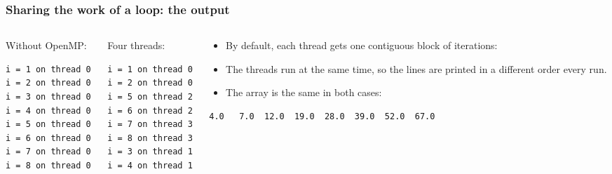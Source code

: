 \begin{frame}[fragile]
  \frametitle{Sharing the work of a loop: the output}
  \begin{columns}[T]
    \begin{column}{0.25\textwidth}
      Without OpenMP:
      \begin{lstlisting}[language=bash]
i = 1 on thread 0
i = 2 on thread 0
i = 3 on thread 0
i = 4 on thread 0
i = 5 on thread 0
i = 6 on thread 0
i = 7 on thread 0
i = 8 on thread 0
      \end{lstlisting}
    \end{column}

    \begin{column}{0.25\textwidth}
      Four threads:
      \begin{lstlisting}[language=bash]
i = 1 on thread 0
i = 2 on thread 0
i = 5 on thread 2
i = 6 on thread 2
i = 7 on thread 3
i = 8 on thread 3
i = 3 on thread 1
i = 4 on thread 1
      \end{lstlisting}
    \end{column}

    \begin{column}{0.5\textwidth}
      \begin{itemize}
        \item By default, each thread gets one contiguous block of iterations:
      \end{itemize}

      \vspace*{2mm}
      \centering

      \raggedright
      \begin{itemize}
        \item The threads run at the same time, so the lines are printed in a different order every run.
        \item The array is the same in both cases:
      \end{itemize}
      \begin{lstlisting}[language=bash]
   4.0   7.0  12.0  19.0  28.0  39.0  52.0  67.0
      \end{lstlisting}
    \end{column}
  \end{columns}
\end{frame}


